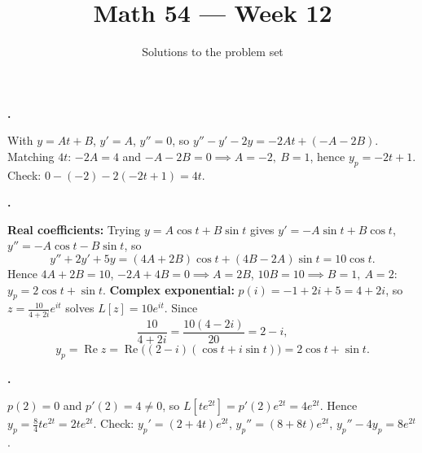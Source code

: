 \documentclass[10pt]{scrartcl}
\title{Math 54 --- Week 12}
\subtitle{Solutions to the problem set}
\author{}\date{}\ihead{}
\begin{document}
\maketitle

\begin{prob}
  \textbf{.}\par{}
  \begin{steps}
    \ii With $y=At+B$, $y'=A$, $y''=0$, so $y''-y'-2y=-2At+(-A-2B)$.
    \ii Matching $4t$: $-2A=4$ and $-A-2B=0\implies A=-2,\ B=1$, hence $y_p=-2t+1$.
    \ii Check: $0-(-2)-2(-2t+1)=4t$.
  \end{steps}
\end{prob}

\begin{prob}
  \textbf{.}\par{}
  \begin{steps}
    \ii \textbf{Real coefficients:} Trying $y=A\cos t+B\sin t$ gives $y'=-A\sin t+B\cos t$, $y''=-A\cos t-B\sin t$, so
    \[
      y''+2y'+5y = (4A+2B)\cos t + (4B-2A)\sin t = 10\cos t.
    \]
    Hence $4A+2B=10$, $-2A+4B=0\implies A=2B$, $10B=10\implies B=1,\ A=2$: $y_p=2\cos t+\sin t$.
    \ii \textbf{Complex exponential:} $p(i)=-1+2i+5=4+2i$, so $z=\frac{10}{4+2i}e^{it}$ solves $L[z]=10e^{it}$. Since
    \[
      \frac{10}{4+2i}=\frac{10(4-2i)}{20}=2-i,
    \]
    \[
      y_p = \operatorname{Re}z = \operatorname{Re}\bigl((2-i)(\cos t+i\sin t)\bigr) = 2\cos t+\sin t.
    \]
  \end{steps}
\end{prob}

\begin{prob}
  \textbf{.}\par{}
  \begin{steps}
    \ii $p(2)=0$ and $p'(2)=4\neq 0$, so $L[te^{2t}]=p'(2)e^{2t}=4e^{2t}$.
    \ii Hence $y_p=\frac84 te^{2t}=2te^{2t}$. Check: $y_p'=(2+4t)e^{2t}$, $y_p''=(8+8t)e^{2t}$, $y_p''-4y_p=8e^{2t}$.
  \end{steps}
\end{prob}
\end{document}
